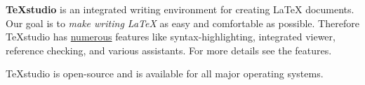 \documentclass{article}
\begin{document}
	\textbf{TeXstudio} is an integrated writing environment for creating LaTeX documents. Our goal is to \emph{make writing LaTeX} as easy and comfortable as possible. Therefore TeXstudio has \underline{numerous} features like syntax-highlighting, integrated viewer, reference checking, and various assistants. For more details see the {\large features}.
	
	{\footnotesize TeXstudio is open-source and is available for all major operating systems.}
	
	\tiny
	\lipsum[1-2]
	\normalsize
	\lipsum[3-4]
\end{document}
